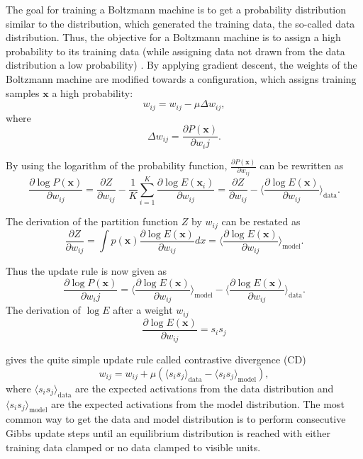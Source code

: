 The goal for training a Boltzmann machine is to get a probability distribution similar to the distribution, which generated the training data, the so-called data distribution.
Thus, the objective for a Boltzmann machine is to assign a high probability to its training data (while assigning data not drawn from the data distribution a low probability) \cite{ackley1985learning, Bengio2009, hinton2002training, Woodford2002}.
By applying gradient descent, the weights of the Boltzmann machine are modified towards a configuration, which assigns training samples $\textbf{x}$ a high probability:
\[
w_{ij} = w_{ij} - \mu \Delta w_{ij},
\]
where
\[
\Delta w_{ij} = \frac{\partial P(\textbf{x})}{\partial w_ij}.
\]

By using the logarithm of the probability function, $\frac{\partial P(\textbf{x})}{\partial w_{ij}}$ can be rewritten as
\[
\frac{\partial \log P(\textbf{x})}{\partial w_{ij}} = \frac{\partial Z}{\partial w_{ij}} - \frac{1}{K} \sum_{i=1}^K \frac{\partial \log E(\textbf{x}_i)}{\partial w_{ij}} =  \frac{\partial Z}{\partial w_{ij}} - \Big \langle \frac{\partial \log E(\textbf{x})}{\partial w_{ij}} \Big \rangle_{\text{data}}.
\]    

The derivation of the partition function $Z$ by $w_{ij}$ can be restated as
\[
 \frac{\partial Z}{\partial w_{ij}} = \int p(\textbf{x}) \frac{\partial \log E(\textbf{x})}{\partial w_{ij}} dx = \Big \langle \frac{\partial \log E(\textbf{x})}{\partial w_{ij}} \Big \rangle_{\text{model}}.
\]

Thus the update rule is now given as
\[
\frac{\partial \log P(\textbf{x})}{\partial w_ij} =  \Big \langle \frac{\partial \log E(\textbf{x})}{\partial w_{ij}} \Big \rangle_{\text{model}} - \Big \langle \frac{\partial \log E(\textbf{x})}{\partial w_{ij}} \Big \rangle_{\text{data}}.
\]
The derivation of $\log E$ after a weight $w_{ij}$
\[
\frac{\partial \log E(\textbf{x})}{\partial w_{ij}} = s_i s_j
\]

gives the quite simple update rule called contrastive divergence (CD)
\[
w_{ij}= w_{ij} + \mu ( \langle s_i s_j \rangle_{\text{data}} - \langle s_i s_j \rangle_{\text{model}} ) ,
\]
where $\langle s_i s_j \rangle_{\text{data}}$ are the expected activations from the data distribution and  $ \langle s_i s_j \rangle_{\text{model}}$ are the expected activations from the model distribution.
The most common way to get the data and model distribution is to perform consecutive Gibbs update steps until an equilibrium distribution is reached with either training data clamped or no data clamped to visible units.

